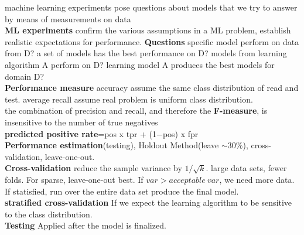 \documentclass[cheatsheet.tex]{subfiles}
\begin{document}
machine learning experiments pose questions about models that we try to answer by means of measurements on data\\
\textbf{ML experiments} confirm the various assumptions in a ML problem, establish realistic expectations for performance. \textbf{Questions} specific model perform on data from D? a set of models has the best performance on D? models from learning algorithm A perform on D? learning model A produces the best models for domain D?\\

\textbf{Performance measure} accuracy assume the same class distribution of read and test. average recall assume real problem is uniform class distribution.\\
the combination of precision and recall, and therefore the \textbf{F-measure}, is insensitive to the number of true negatives
\\
\textbf{predicted positive rate}=pos x tpr + (1−pos) x fpr
\\
\textbf{Performance estimation}(testing), Holdout Method(leave $\sim30\%$), cross-validation, leave-one-out.
\\
\textbf{Cross-validation} reduce the sample variance by $1/\sqrt{k}$. large data sets, fewer folds. For sparse, leave-one-out best. If $var>acceptable\ var$, we need more data. If statisfied, run over the entire data set produce the final model. \\
\textbf{stratified cross-validation} If we expect the learning algorithm to be sensitive to the class distribution. \\
\textbf{Testing} Applied after the model is finalized. 
\end{document}
